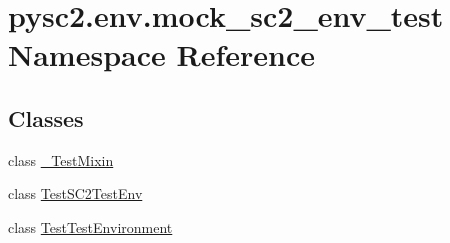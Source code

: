\hypertarget{namespacepysc2_1_1env_1_1mock__sc2__env__test}{}\section{pysc2.\+env.\+mock\+\_\+sc2\+\_\+env\+\_\+test Namespace Reference}
\label{namespacepysc2_1_1env_1_1mock__sc2__env__test}
\subsection*{Classes}
\begin{DoxyCompactItemize}
\item 
class \mbox{\hyperlink{classpysc2_1_1env_1_1mock__sc2__env__test_1_1___test_mixin}{\+\_\+\+Test\+Mixin}}
\item 
class \mbox{\hyperlink{classpysc2_1_1env_1_1mock__sc2__env__test_1_1_test_s_c2_test_env}{Test\+S\+C2\+Test\+Env}}
\item 
class \mbox{\hyperlink{classpysc2_1_1env_1_1mock__sc2__env__test_1_1_test_test_environment}{Test\+Test\+Environment}}
\end{DoxyCompactItemize}
